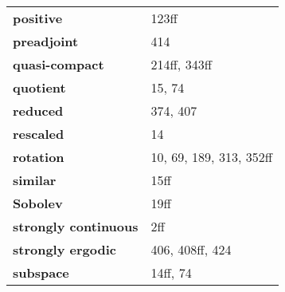 \documentclass[10pt]{scrartcl}
\begin{document}
\begin{longtable}{>{\bfseries}p{6cm}p{8cm}}
\quad positive & 123ff \\
\quad preadjoint & 414 \\
\quad quasi-compact & 214ff, 343ff \\
\quad quotient & 15, 74 \\
\quad reduced & 374, 407 \\
\quad rescaled & 14 \\
\quad rotation & 10, 69, 189, 313, 352ff \\
\quad similar & 15ff \\
\quad Sobolev & 19ff \\
\quad strongly continuous & 2ff \\
\quad strongly ergodic & 406, 408ff, 424 \\
\quad subspace & 14ff, 74 \\

\end{longtable}
\end{document}
